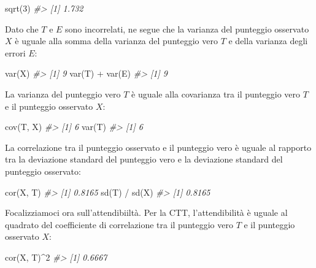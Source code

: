 \documentclass[
  11pt,
]{krantz}
\makeatletter
\newenvironment{Shaded}{\begin{snugshade}}{\end{snugshade}}
\newcommand{\CommentTok}[1]{\textcolor[rgb]{0.37,0.37,0.37}{\textit{#1}}}
\newcommand{\DecValTok}[1]{\textcolor[rgb]{0.06,0.06,0.06}{#1}}
\newcommand{\FunctionTok}[1]{\textcolor[rgb]{0,0,0}{#1}}
\newcommand{\NormalTok}[1]{#1}
\newcommand{\SpecialCharTok}[1]{\textcolor[rgb]{0,0,0}{#1}}
\newenvironment{kframe}{%
\medskip{}
\setlength{\fboxsep}{.8em}
 \def\at@end@of@kframe{}%
 \ifinner\ifhmode%
  \def\at@end@of@kframe{\end{minipage}}%
  \begin{minipage}{\columnwidth}%
 \fi\fi%
 \def\FrameCommand##1{\hskip\@totalleftmargin \hskip-\fboxsep
 \colorbox{shadecolor}{##1}\hskip-\fboxsep
     \hskip-\linewidth \hskip-\@totalleftmargin \hskip\columnwidth}%
 \MakeFramed {\advance\hsize-\width
   \@totalleftmargin\z@ \linewidth\hsize
   \@setminipage}}%
 {\par\unskip\endMakeFramed%
 \at@end@of@kframe}
\renewenvironment{Shaded}{\begin{kframe}}{\end{kframe}}
\theoremstyle{definition}
\theoremstyle{definition}
\theoremstyle{definition}
\theoremstyle{definition}
\theoremstyle{remark}
\makeatother
\begin{document}
\begin{Shaded}
\begin{Highlighting}[]
\FunctionTok{sqrt}\NormalTok{(}\DecValTok{3}\NormalTok{)}
\CommentTok{\#\textgreater{} [1] 1.732}
\end{Highlighting}
\end{Shaded}

Dato che \(T\) e \(E\) sono incorrelati, ne segue che la varianza del punteggio osservato \(X\) è uguale alla somma della varianza del punteggio vero \(T\) e della varianza degli errori \(E\):

\begin{Shaded}
\begin{Highlighting}[]
\FunctionTok{var}\NormalTok{(X)}
\CommentTok{\#\textgreater{} [1] 9}
\FunctionTok{var}\NormalTok{(T) }\SpecialCharTok{+} \FunctionTok{var}\NormalTok{(E)}
\CommentTok{\#\textgreater{} [1] 9}
\end{Highlighting}
\end{Shaded}

La varianza del punteggio vero \(T\) è uguale alla covarianza tra il punteggio vero \(T\) e il punteggio osservato \(X\):

\begin{Shaded}
\begin{Highlighting}[]
\FunctionTok{cov}\NormalTok{(T, X)}
\CommentTok{\#\textgreater{} [1] 6}
\FunctionTok{var}\NormalTok{(T)}
\CommentTok{\#\textgreater{} [1] 6}
\end{Highlighting}
\end{Shaded}

La correlazione tra il punteggio osservato e il punteggio vero è uguale al rapporto tra la deviazione standard del punteggio vero e la deviazione standard del punteggio osservato:

\begin{Shaded}
\begin{Highlighting}[]
\FunctionTok{cor}\NormalTok{(X, T)}
\CommentTok{\#\textgreater{} [1] 0.8165}
\FunctionTok{sd}\NormalTok{(T) }\SpecialCharTok{/} \FunctionTok{sd}\NormalTok{(X)}
\CommentTok{\#\textgreater{} [1] 0.8165}
\end{Highlighting}
\end{Shaded}

Focalizziamoci ora sull'attendibiiltà. Per la CTT, l'attendibilità è uguale al quadrato del coefficiente di correlazione tra il punteggio vero \(T\) e il punteggio osservato \(X\):

\begin{Shaded}
\begin{Highlighting}[]
\FunctionTok{cor}\NormalTok{(X, T)}\SpecialCharTok{\^{}}\DecValTok{2}
\CommentTok{\#\textgreater{} [1] 0.6667}
\end{Highlighting}
\end{Shaded}
\end{document}
